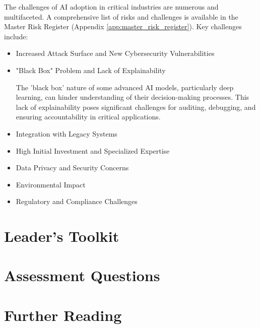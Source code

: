 The challenges of AI adoption in critical industries are numerous and multifaceted. A comprehensive list of risks and challenges is available in the Master Risk Register (Appendix \ref{app:master_risk_register}). Key challenges include:

\begin{itemize}
    \item Increased Attack Surface and New Cybersecurity Vulnerabilities
    \item "Black Box" Problem and Lack of Explainability

\begin{notebox}
The 'black box' nature of some advanced AI models, particularly deep learning, can hinder understanding of their decision-making processes. This lack of explainability poses significant challenges for auditing, debugging, and ensuring accountability in critical applications.
\end{notebox}
    \item Integration with Legacy Systems
    \item High Initial Investment and Specialized Expertise
    \item Data Privacy and Security Concerns
    \item Environmental Impact
    \item Regulatory and Compliance Challenges
\end{itemize}




\section{Leader's Toolkit}
\label{sec:ai_revolution_leaders_toolkit}

\section{Assessment Questions}
\label{sec:ai_revolution_assessment_questions}

\section{Further Reading}
\label{sec:ai_revolution_further_reading}